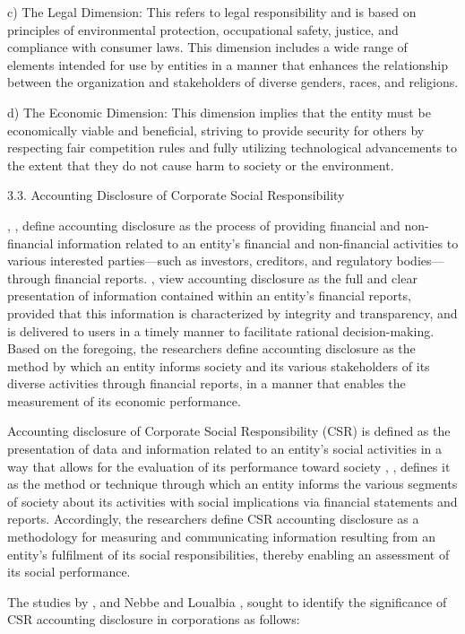 \documentclass[10pt]{NSP1}
\begin{document}
c) The Legal Dimension: This refers to legal responsibility and is based on principles of environmental protection, occupational safety, justice, and compliance with consumer laws. This dimension includes a wide range of elements intended for use by entities in a manner that enhances the relationship between the organization and stakeholders of diverse genders, races, and religions.

d) The Economic Dimension: This dimension implies that the entity must be economically viable and beneficial, striving to provide security for others by respecting fair competition rules and fully utilizing technological advancements to the extent that they do not cause harm to society or the environment.

3.3. Accounting Disclosure of Corporate Social Responsibility

\cite{ref36} , \cite{ref30}, define accounting disclosure as the process of providing financial and non-financial information related to an entity's financial and non-financial activities to various interested parties—such as investors, creditors, and regulatory bodies—through financial reports. \cite{ref9}, view accounting disclosure as the full and clear presentation of information contained within an entity's financial reports, provided that this information is characterized by integrity and transparency, and is delivered to users in a timely manner to facilitate rational decision-making. Based on the foregoing, the researchers define accounting disclosure as the method by which an entity informs society and its various stakeholders of its diverse activities through financial reports, in a manner that enables the measurement of its economic performance.

Accounting disclosure of Corporate Social Responsibility (CSR) is defined as the presentation of data and information related to an entity's social activities in a way that allows for the evaluation of its performance toward society \cite{ref21}, \cite{ref22}, defines it as the method or technique through which an entity informs the various segments of society about its activities with social implications via financial statements and reports. Accordingly, the researchers define CSR accounting disclosure as a methodology for measuring and communicating information resulting from an entity’s fulfilment of its social responsibilities, thereby enabling an assessment of its social performance.

The studies by \cite{ref23}, and Nebbe and Loualbia \cite{ref24}, sought to identify the significance of CSR accounting disclosure in corporations as follows:
\end{document}
